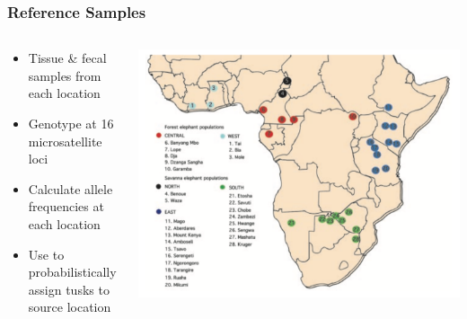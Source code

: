 \documentclass[10pt]{beamer}
\begin{document}
\begin{frame}[t]
\frametitle{Reference Samples}
\vspace{0.5cm}
	
	\begin{columns}
		\begin{column}{0.5\textwidth}
			\begin{itemize}
				\item Tissue \& fecal samples from each location
				\smallskip
				\item Genotype at 16 microsatellite loci
				\smallskip
				\item Calculate allele frequencies at each location
				\smallskip
				\item Use to probabilistically assign tusks to source location
			\end{itemize}
		\end{column}
		
		\begin{column}{0.5\textwidth}
			\begin{center}
				\includegraphics[width=1.0\textwidth]{figures/wasser_map1.png}
			\end{center}
		\end{column}
	\end{columns}
\end{frame}
\end{document}

